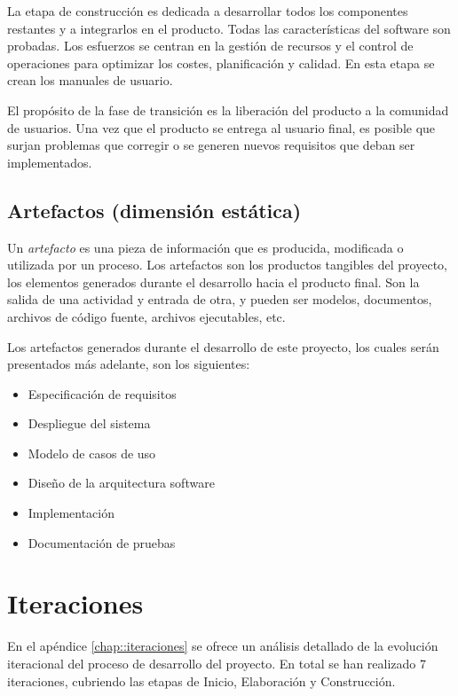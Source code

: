 La etapa de construcción es dedicada a desarrollar todos los componentes restantes y a integrarlos en el producto. Todas las características del software son probadas. Los esfuerzos se centran en la gestión de recursos y el control de operaciones para optimizar los costes, planificación y calidad. En esta etapa se crean los manuales de usuario.

El propósito de la fase de transición es la liberación del producto a la comunidad de usuarios. Una vez que el producto se entrega al usuario final, es posible que surjan problemas que corregir o se generen nuevos requisitos que deban ser implementados.

\subsection{Artefactos (dimensión estática)}

Un \emph{artefacto} es una pieza de información que es producida, modificada o utilizada por un proceso. Los artefactos son los productos tangibles del proyecto, los elementos generados durante el desarrollo hacia el producto final. Son la salida de una actividad y entrada de otra, y pueden ser modelos, documentos, archivos de código fuente, archivos ejecutables, etc.

Los artefactos generados durante el desarrollo de este proyecto, los cuales serán presentados más adelante, son los siguientes:

\begin{itemize}
\item Especificación de requisitos
\item Despliegue del sistema
\item Modelo de casos de uso
\item Diseño de la arquitectura software
\item Implementación
\item Documentación de pruebas
\end{itemize}



\section{Iteraciones}

En el apéndice \ref{chap::iteraciones} se ofrece un análisis detallado de la evolución iteracional del proceso de desarrollo del proyecto. En total se han realizado 7 iteraciones, cubriendo las etapas de Inicio, Elaboración y Construcción.

